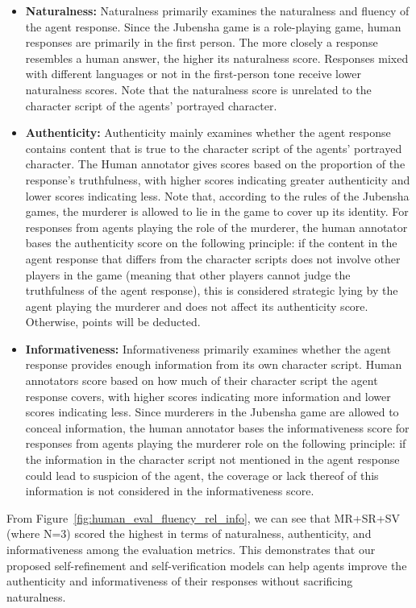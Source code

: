 \documentclass[11pt]{article}
\begin{document}
\begin{itemize}
    \item \textbf{Naturalness:} Naturalness primarily examines the naturalness and fluency of the agent response. Since the Jubensha game is a role-playing game, human responses are primarily in the first person. The more closely a response resembles a human answer, the higher its naturalness score. Responses mixed with different languages or not in the first-person tone receive lower naturalness scores. Note that the naturalness score is unrelated to the character script of the agents' portrayed character.
    
    \item \textbf{Authenticity:} Authenticity mainly examines whether the agent response contains content that is true to the character script of the agents' portrayed character. The Human annotator gives scores based on the proportion of the response's truthfulness, with higher scores indicating greater authenticity and lower scores indicating less. Note that, according to the rules of the Jubensha games, the murderer is allowed to lie in the game to cover up its identity. For responses from agents playing the role of the murderer, the human annotator bases the authenticity score on the following principle: if the content in the agent response that differs from the character scripts does not involve other players in the game (meaning that other players cannot judge the truthfulness of the agent response), this is considered strategic lying by the agent playing the murderer and does not affect its authenticity score. Otherwise, points will be deducted.
    
    \item \textbf{Informativeness:} Informativeness primarily examines whether the agent response provides enough information from its own character script. Human annotators score based on how much of their character script the agent response covers, with higher scores indicating more information and lower scores indicating less. Since murderers in the Jubensha game are allowed to conceal information, the human annotator bases the informativeness score for responses from agents playing the murderer role on the following principle: if the information in the character script not mentioned in the agent response could lead to suspicion of the agent, the coverage or lack thereof of this information is not considered in the informativeness score.
\end{itemize}

From Figure~\ref{fig:human_eval_fluency_rel_info}, we can see that MR+SR+SV (where N=3) scored the highest in terms of naturalness, authenticity, and informativeness among the evaluation metrics. This demonstrates that our proposed self-refinement and self-verification models can help agents improve the authenticity and informativeness of their responses without sacrificing naturalness.
\end{document}
